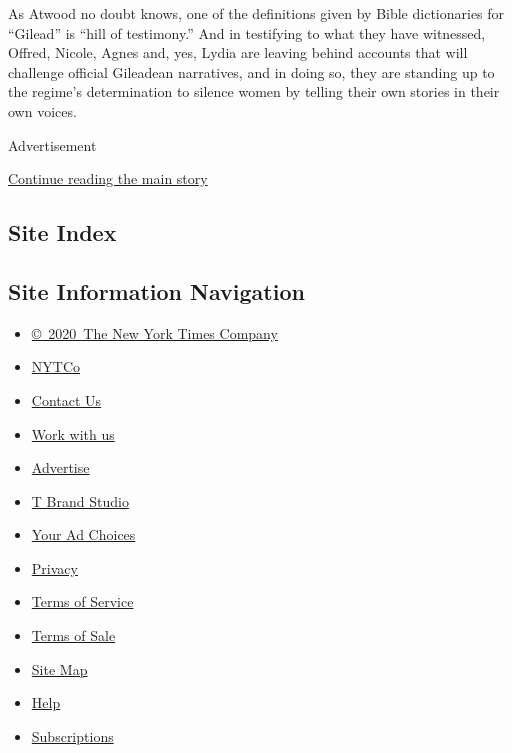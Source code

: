 As Atwood no doubt knows, one of the definitions given by Bible
dictionaries for ``Gilead'' is ``hill of testimony.'' And in testifying
to what they have witnessed, Offred, Nicole, Agnes and, yes, Lydia are
leaving behind accounts that will challenge official Gileadean
narratives, and in doing so, they are standing up to the regime's
determination to silence women by telling their own stories in their own
voices.

Advertisement

\protect\hyperlink{after-bottom}{Continue reading the main story}

\hypertarget{site-index}{%
\subsection{Site Index}\label{site-index}}

\hypertarget{site-information-navigation}{%
\subsection{Site Information
Navigation}\label{site-information-navigation}}

\begin{itemize}
\tightlist
\item
  \href{https://help.nytimes3xbfgragh.onion/hc/en-us/articles/115014792127-Copyright-notice}{©~2020~The
  New York Times Company}
\end{itemize}

\begin{itemize}
\tightlist
\item
  \href{https://www.nytco.com/}{NYTCo}
\item
  \href{https://help.nytimes3xbfgragh.onion/hc/en-us/articles/115015385887-Contact-Us}{Contact
  Us}
\item
  \href{https://www.nytco.com/careers/}{Work with us}
\item
  \href{https://nytmediakit.com/}{Advertise}
\item
  \href{http://www.tbrandstudio.com/}{T Brand Studio}
\item
  \href{https://www.nytimes3xbfgragh.onion/privacy/cookie-policy\#how-do-i-manage-trackers}{Your
  Ad Choices}
\item
  \href{https://www.nytimes3xbfgragh.onion/privacy}{Privacy}
\item
  \href{https://help.nytimes3xbfgragh.onion/hc/en-us/articles/115014893428-Terms-of-service}{Terms
  of Service}
\item
  \href{https://help.nytimes3xbfgragh.onion/hc/en-us/articles/115014893968-Terms-of-sale}{Terms
  of Sale}
\item
  \href{https://spiderbites.nytimes3xbfgragh.onion}{Site Map}
\item
  \href{https://help.nytimes3xbfgragh.onion/hc/en-us}{Help}
\item
  \href{https://www.nytimes3xbfgragh.onion/subscription?campaignId=37WXW}{Subscriptions}
\end{itemize}
